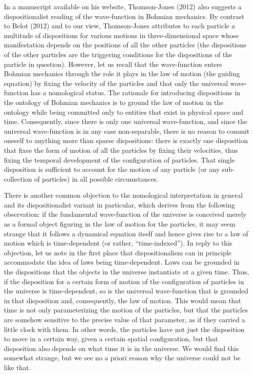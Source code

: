 \documentclass[12pt]{article}
\theoremstyle{definition}
\begin{document}
In a manuscript available on his website, Thomson-Jones (2012) also suggests a dispositionalist reading of the wave-function in Bohmian mechanics. By contrast to Belot (2012) and to our view, Thomson-Jones attributes to each particle a multitude of dispositions for various motions in three-dimensional space whose manifestation depends on the positions of all the other particles (the dispositions of the other particles are the triggering conditions for the dispositions of the particle in question). However, let us recall that the wave-function enters Bohmian mechanics through the role it plays in the law of motion (the guiding equation) by fixing the velocity of the particles and that only the universal wave-function has a nomological status. The rationale for introducing dispositions in the ontology of Bohmian mechanics is to ground the law of motion in the ontology while being committed only to entities that exist in physical space and time. Consequently, since there is only one universal wave-function, and since the universal wave-function is in any case non-separable, there is no reason to commit oneself to anything more than sparse dispositions: there is exactly one disposition that fixes the form of motion of all the particles by fixing their velocities, thus fixing the temporal development of the configuration of particles. That single disposition is sufficient to account for the motion of any particle (or any sub-collection of particles) in all possible circumstances.

There is another common objection to the nomological interpretation in general and its dispositionalist variant in particular, which derives from the following observation: if the fundamental wave-function of the universe is conceived merely as a formal object figuring in the law of motion for the particles, it may seem strange that it follows a dynamical equation itself and hence gives rise to a law of motion which is time-dependent (or rather, ``time-indexed''). In reply to this objection, let us note in the first place that dispositionalism can in principle accommodate the idea of laws being time-dependent. Laws can be grounded in the dispositions that the objects in the universe instantiate at a given time. Thus, if the disposition for a certain form of motion of the configuration of particles in the universe is time-dependent, so is the universal wave-function that is grounded in that disposition and, consequently, the law of motion. This would mean that time is not only parameterizing the motion of the particles, but that the particles are somehow sensitive to the precise value of that parameter, as if they carried a little clock with them. In other words, the particles have not just the disposition to move in a certain way, given a certain spatial configuration, but that disposition also depends on what time it is in the universe. We would find this somewhat strange, but we see no a priori reason why the universe could not be like that.
\end{document}
